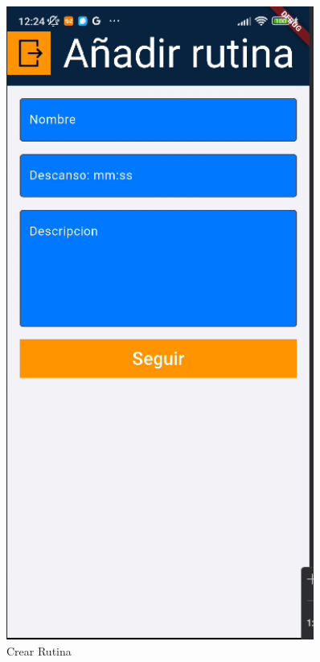 \begin{figure}[H]
\begin{minipage}{0.45\textwidth}
      \centering
      \includegraphics[width=0.9\textwidth]{pantallas/crearRutina.png}
      \caption{Crear Rutina}
      \label{fig:crearRutina}
   \end{minipage}
\end{figure}

